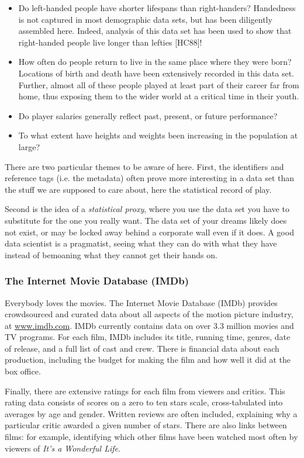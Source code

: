 \documentclass[10pt]{article}
\begin{document}
\begin{itemize}
  \item Do left-handed people have shorter lifespans than right-handers? Handedness is not captured in most demographic data sets, but has been diligently assembled here. Indeed, analysis of this data set has been used to show that right-handed people live longer than lefties [HC88]!
  \item How often do people return to live in the same place where they were born? Locations of birth and death have been extensively recorded in this data set. Further, almost all of these people played at least part of their career far from home, thus exposing them to the wider world at a critical time in their youth.
  \item Do player salaries generally reflect past, present, or future performance?
  \item To what extent have heights and weights been increasing in the population at large?
\end{itemize}

There are two particular themes to be aware of here. First, the identifiers and reference tags (i.e. the metadata) often prove more interesting in a data set than the stuff we are supposed to care about, here the statistical record of play.

Second is the idea of a \textit{statistical proxy}, where you use the data set you have to substitute for the one you really want. The data set of your dreams likely does not exist, or may be locked away behind a corporate wall even if it does. A good data scientist is a pragmatist, seeing what they can do with what they have instead of bemoaning what they cannot get their hands on.

\subsubsection*{The Internet Movie Database (IMDb)}
Everybody loves the movies. The Internet Movie Database (IMDb) provides crowdsourced and curated data about all aspects of the motion picture industry, at \href{http://www.imdb.com}{www.imdb.com}. IMDb currently contains data on over 3.3 million movies and TV programs. For each film, IMDb includes its title, running time, genres, date of release, and a full list of cast and crew. There is financial data about each production, including the budget for making the film and how well it did at the box office.

Finally, there are extensive ratings for each film from viewers and critics. This rating data consists of scores on a zero to ten stars scale, cross-tabulated into averages by age and gender. Written reviews are often included, explaining why a particular critic awarded a given number of stars. There are also links between films: for example, identifying which other films have been watched most often by viewers of \textit{It's a Wonderful Life}.
\end{document}
